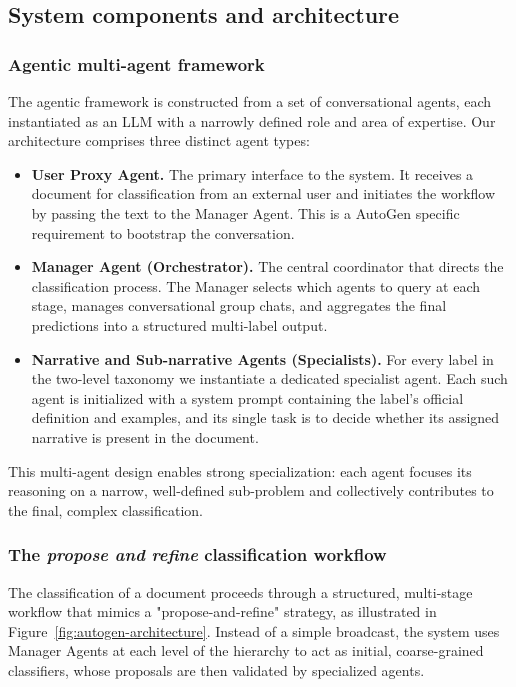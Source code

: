 \subsection{System components and architecture}

\subsubsection{Agentic multi-agent framework}

The agentic framework is constructed from a set of conversational agents, each instantiated as an LLM with a narrowly defined role and area of expertise. Our architecture comprises three distinct agent types:

\begin{itemize}
  \item \textbf{User Proxy Agent.} The primary interface to the system. It receives a document for classification from an external user and initiates the workflow by passing the text to the Manager Agent. This is a AutoGen specific requirement to bootstrap the conversation.
  \item \textbf{Manager Agent (Orchestrator).} The central coordinator that directs the classification process. The Manager selects which agents to query at each stage, manages conversational group chats, and aggregates the final predictions into a structured multi-label output.
  \item \textbf{Narrative and Sub-narrative Agents (Specialists).} For every label in the two-level taxonomy we instantiate a dedicated specialist agent. Each such agent is initialized with a system prompt containing the label's official definition and examples, and its single task is to decide whether its assigned narrative is present in the document.
\end{itemize}

This multi-agent design enables strong specialization: each agent focuses its reasoning on a narrow, well-defined sub-problem and collectively contributes to the final, complex classification.

\subsubsection{The \textit{propose and refine} classification workflow}

The classification of a document proceeds through a structured, multi-stage workflow that mimics a "propose-and-refine" strategy, as illustrated in Figure~\ref{fig:autogen-architecture}. Instead of a simple broadcast, the system uses Manager Agents at each level of the hierarchy to act as initial, coarse-grained classifiers, whose proposals are then validated by specialized agents.

